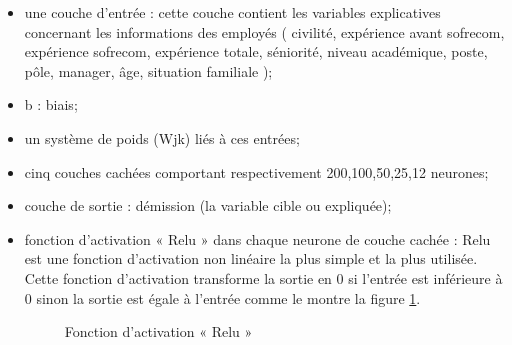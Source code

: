 \begin{itemize}
    \item une couche d'entrée : cette couche contient les variables explicatives concernant les informations des employés  ( civilité, expérience avant sofrecom, expérience sofrecom, expérience totale, séniorité, niveau académique, poste, pôle, manager, âge, situation familiale );
    \item b : biais;
    \item un système de poids (Wjk) liés à ces entrées;
    \item cinq couches cachées comportant respectivement 200,100,50,25,12 neurones;
     \item couche de sortie : démission (la variable cible ou expliquée);   
     \item fonction d'activation « Relu » dans chaque neurone de couche cachée : Relu est une fonction d'activation non linéaire la plus simple et la plus utilisée.
     \newpage
     Cette fonction d'activation transforme la sortie en 0 si l'entrée est inférieure à 0 sinon la sortie est égale à l'entrée comme le montre la figure \ref{fig:relu}.
        \begin{figure}[htpb]
    \centering
    \caption{Fonction d'activation « Relu »}
    \label{fig:relu}
    \end{figure}


\end{itemize}

